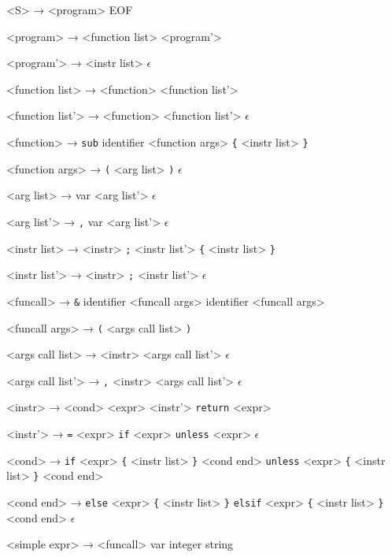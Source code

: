 ﻿<S>              → <program> EOF

<program>        → <function list> <program'>

<program'>       → <instr list>
                 \alt $\epsilon$

<function list>  → <function> <function list'>
                 
<function list'> → <function> <function list'>
		 \alt $\epsilon$

<function>       → \texttt{sub} identifier <function args> \texttt{\{} <instr list> \texttt{\}}

<function args>  → \texttt{(} <arg list> \texttt{)}
                 \alt $\epsilon$

<arg list>       → var <arg list'>
                 \alt $\epsilon$

<arg list'>      → \texttt{,} var <arg list'>
                 \alt $\epsilon$

<instr list>     → <instr> \texttt{;} <instr list'>
                 \alt \texttt{\{} <instr list> \texttt{\}}

<instr list'>    → <instr> \texttt{;} <instr list'>
                 \alt $\epsilon$

<funcall>        → \texttt{&} identifier <funcall args>
                 \alt identifier <funcall args>

<funcall args>   → \texttt{(} <args call list> \texttt{)}

<args call list> → <instr> <args call list'>
                 \alt $\epsilon$

<args call list'> → \texttt{,} <instr> <args call list'>
                 \alt $\epsilon$

<instr>          → <cond>
                 \alt <expr> <instr'> 
                 \alt \texttt{return} <expr>

<instr'>         → \texttt{=} <expr>
                 \alt \texttt{if} <expr>
                 \alt \texttt{unless} <expr>
                 \alt $\epsilon$

<cond>           → \texttt{if} <expr> \texttt{\{} <instr list> \texttt{\}} <cond end>
                 \alt \texttt{unless} <expr> \texttt{\{} <instr list> \texttt{\}} <cond end>

<cond end>       → \texttt{else} <expr> \texttt{\{} <instr list> \texttt{\}}
                 \alt \texttt{elsif} <expr> \texttt{\{} <instr list> \texttt{\}} <cond end>
                 \alt $\epsilon$

<simple expr>    → <funcall>
                 \alt var
                 \alt integer
                 \alt string


